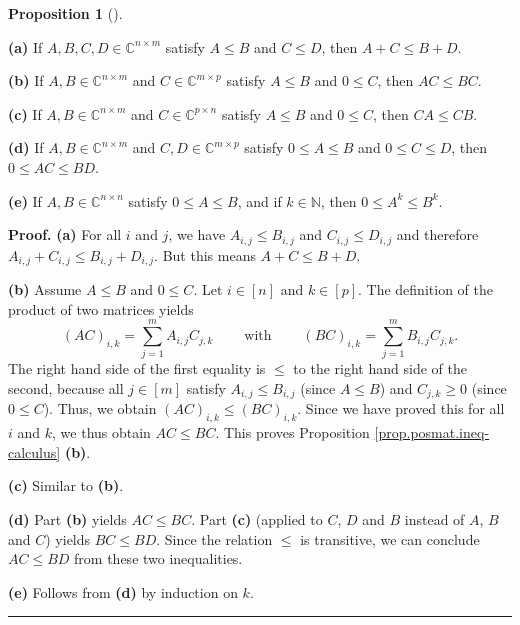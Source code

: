 \documentclass[numbers=enddot,12pt,final,onecolumn,notitlepage]{scrartcl}%
\numberwithin{exer}{subsection}
\theoremstyle{definition}
\newtheorem{prop}[theo]{Proposition}
\newenvironment{proposition}[1][]
{\begin{prop}[#1]\begin{leftbar}}
{\end{leftbar}\end{prop}}
\newenvironment{proof}[1][Proof]{\noindent\textbf{#1.} }{\ \rule{0.5em}{0.5em}}
\let\sumnonlimits\sum
\renewcommand{\sum}{\sumnonlimits\limits}
\begin{document}
\begin{proposition}
\label{prop.posmat.ineq-calculus}\textbf{(a)} If $A,B,C,D\in\mathbb{C}%
^{n\times m}$ satisfy $A\leq B$ and $C\leq D$, then $A+C\leq B+D$. \medskip

\textbf{(b)} If $A,B\in\mathbb{C}^{n\times m}$ and $C\in\mathbb{C}^{m\times
p}$ satisfy $A\leq B$ and $0\leq C$, then $AC\leq BC$. \medskip

\textbf{(c)} If $A,B\in\mathbb{C}^{n\times m}$ and $C\in\mathbb{C}^{p\times
n}$ satisfy $A\leq B$ and $0\leq C$, then $CA\leq CB$. \medskip

\textbf{(d)} If $A,B\in\mathbb{C}^{n\times m}$ and $C,D\in\mathbb{C}^{m\times
p}$ satisfy $0\leq A\leq B$ and $0\leq C\leq D$, then $0\leq AC\leq BD$.
\medskip

\textbf{(e)} If $A,B\in\mathbb{C}^{n\times n}$ satisfy $0\leq A\leq B$, and if
$k\in\mathbb{N}$, then $0\leq A^{k}\leq B^{k}$.
\end{proposition}

\begin{proof}
\textbf{(a)} For all $i$ and $j$, we have $A_{i,j}\leq B_{i,j}$ and
$C_{i,j}\leq D_{i,j}$ and therefore $A_{i,j}+C_{i,j}\leq B_{i,j}+D_{i,j}$. But
this means $A+C\leq B+D$. \medskip

\textbf{(b)} Assume $A\leq B$ and $0\leq C$. Let $i\in\left[  n\right]  $ and
$k\in\left[  p\right]  $. The definition of the product of two matrices
yields
\[
\left(  AC\right)  _{i,k}=\sum_{j=1}^{m}A_{i,j}C_{j,k}%
\ \ \ \ \ \ \ \ \ \ \text{with}\ \ \ \ \ \ \ \ \ \ \left(  BC\right)
_{i,k}=\sum_{j=1}^{m}B_{i,j}C_{j,k}.
\]
The right hand side of the first equality is $\leq$ to the right hand side of
the second, because all $j\in\left[  m\right]  $ satisfy $A_{i,j}\leq B_{i,j}$
(since $A\leq B$) and $C_{j,k}\geq0$ (since $0\leq C$). Thus, we obtain
$\left(  AC\right)  _{i,k}\leq\left(  BC\right)  _{i,k}$. Since we have proved
this for all $i$ and $k$, we thus obtain $AC\leq BC$. This proves Proposition
\ref{prop.posmat.ineq-calculus} \textbf{(b)}. \medskip

\textbf{(c)} Similar to \textbf{(b)}. \medskip

\textbf{(d)} Part \textbf{(b)} yields $AC\leq BC$. Part \textbf{(c)} (applied
to $C$, $D$ and $B$ instead of $A$, $B$ and $C$) yields $BC\leq BD$. Since the
relation $\leq$ is transitive, we can conclude $AC\leq BD$ from these two
inequalities. \medskip

\textbf{(e)} Follows from \textbf{(d)} by induction on $k$.
\end{proof}
\end{document}
